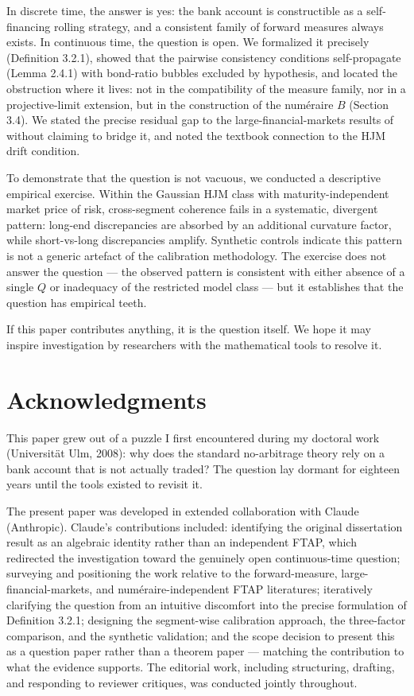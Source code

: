 \documentclass[
]{article}
\begin{document}
In discrete time, the answer is yes: the bank account is constructible
as a self-financing rolling strategy, and a consistent family of forward
measures always exists. In continuous time, the question is open. We
formalized it precisely (Definition 3.2.1), showed that the pairwise
consistency conditions self-propagate (Lemma 2.4.1) with bond-ratio
bubbles excluded by hypothesis, and located the obstruction where it
lives: not in the compatibility of the measure family, nor in a
projective-limit extension, but in the construction of the numéraire
\(B\) (Section 3.4). We stated the precise residual gap to the
large-financial-markets results of \citet{KleinSchmidtTeichmann2016}
without claiming to bridge it, and noted the textbook connection to the
HJM drift condition.

To demonstrate that the question is not vacuous, we conducted a
descriptive empirical exercise. Within the Gaussian HJM class with
maturity-independent market price of risk, cross-segment coherence fails
in a systematic, divergent pattern: long-end discrepancies are absorbed
by an additional curvature factor, while short-vs-long discrepancies
amplify. Synthetic controls indicate this pattern is not a generic
artefact of the calibration methodology. The exercise does not answer
the question --- the observed pattern is consistent with either absence
of a single \(Q\) or inadequacy of the restricted model class --- but it
establishes that the question has empirical teeth.

If this paper contributes anything, it is the question itself. We hope
it may inspire investigation by researchers with the mathematical tools
to resolve it.

\section{Acknowledgments}\label{acknowledgments}

This paper grew out of a puzzle I first encountered during my doctoral
work (Universität Ulm, 2008): why does the standard no-arbitrage theory
rely on a bank account that is not actually traded? The question lay
dormant for eighteen years until the tools existed to revisit it.

The present paper was developed in extended collaboration with Claude
(Anthropic). Claude's contributions included: identifying the original
dissertation result as an algebraic identity rather than an independent
FTAP, which redirected the investigation toward the genuinely open
continuous-time question; surveying and positioning the work relative to
the forward-measure, large-financial-markets, and numéraire-independent
FTAP literatures; iteratively clarifying the question from an intuitive
discomfort into the precise formulation of Definition 3.2.1; designing
the segment-wise calibration approach, the three-factor comparison, and
the synthetic validation; and the scope decision to present this as a
question paper rather than a theorem paper --- matching the contribution
to what the evidence supports. The editorial work, including
structuring, drafting, and responding to reviewer critiques, was
conducted jointly throughout.
\end{document}
